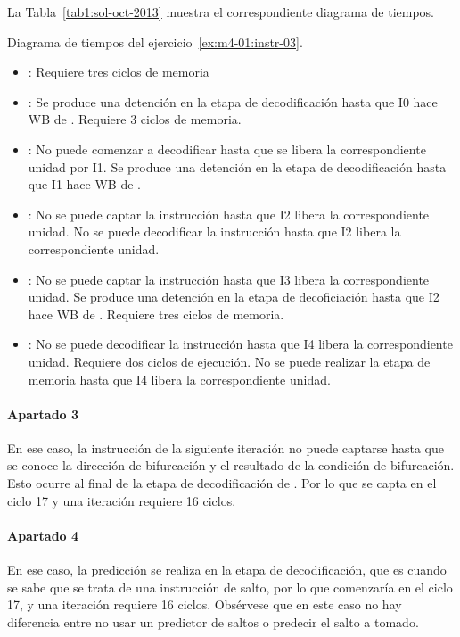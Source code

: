 La Tabla~\ref{tab1:sol-oct-2013} muestra el correspondiente diagrama de
tiempos.

\begin{table}[htb]

\caption{Diagrama de tiempos del ejercicio~\ref{ex:m4-01:instr-03}.}
\label{tab1:sol-oct-2013}
\end{table}

\begin{itemize}

\item {}: Requiere tres ciclos de memoria

\item {}: Se produce una detención en la etapa de decodificación hasta que 
I0 hace WB de .
Requiere 3 ciclos de memoria.

\item {}: 
No puede comenzar a decodificar hasta que se libera la correspondiente unidad por I1.
Se produce una detención en la etapa de decodificación hasta que I1 hace WB de .

\item {}: 
No se puede captar la instrucción hasta que I2 libera la correspondiente unidad.
No se puede decodificar la instrucción hasta que I2 libera la correspondiente unidad.

\item {}:
No se puede captar la instrucción hasta que I3 libera la correspondiente unidad.
Se produce una detención en la etapa de decoficiación hasta que I2 hace WB de .
Requiere tres ciclos de memoria.

\item {}: 
No se puede decodificar la instrucción hasta que I4 libera la correspondiente unidad.
Requiere dos ciclos de ejecución.
No se puede realizar la etapa de memoria hasta que I4 libera la correspondiente unidad.

\end{itemize}

\paragraph{Apartado 3}

En ese caso, la instrucción  de la siguiente iteración no puede
captarse hasta que se conoce la dirección de bifurcación y el resultado
de la condición de bifurcación. Esto ocurre al final de la etapa de
decodificación de . Por lo que  se capta en el ciclo 17 
y una iteración requiere 16 ciclos.

\paragraph{Apartado 4}

En ese caso, la predicción se realiza en la etapa de decodificación, que es
cuando se sabe que se trata de una instrucción de salto, por lo que 
comenzaría en el ciclo 17, y una iteración requiere 16 ciclos.
Obsérvese que en este caso no hay diferencia entre no usar un predictor de saltos o predecir el salto a tomado.


